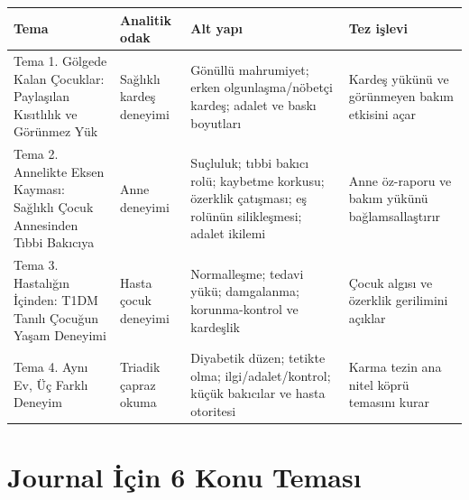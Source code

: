 \documentclass[
  turkish,
  a4paper,
  DIV=11,
  numbers=noendperiod]{scrreprt}
\newcounter{none} %
\begin{document}
{\def\LTcaptype{none} %
\begin{longtable}[]{@{}
  >{\raggedright\arraybackslash}p{}
  >{\raggedright\arraybackslash}p{}
  >{\raggedright\arraybackslash}p{}
  >{\raggedright\arraybackslash}p{}@{}}
\toprule\noalign{}
\begin{minipage}[b]{\linewidth}\raggedright
Tema
\end{minipage} & \begin{minipage}[b]{\linewidth}\raggedright
Analitik odak
\end{minipage} & \begin{minipage}[b]{\linewidth}\raggedright
Alt yapı
\end{minipage} & \begin{minipage}[b]{\linewidth}\raggedright
Tez işlevi
\end{minipage} \\
\midrule\noalign{}
\endhead
\bottomrule\noalign{}
\endlastfoot
Tema 1. Gölgede Kalan Çocuklar: Paylaşılan Kısıtlılık ve Görünmez Yük &
Sağlıklı kardeş deneyimi & Gönüllü mahrumiyet; erken olgunlaşma/nöbetçi
kardeş; adalet ve baskı boyutları & Kardeş yükünü ve görünmeyen bakım
etkisini açar \\
Tema 2. Annelikte Eksen Kayması: Sağlıklı Çocuk Annesinden Tıbbi
Bakıcıya & Anne deneyimi & Suçluluk; tıbbi bakıcı rolü; kaybetme
korkusu; özerklik çatışması; eş rolünün silikleşmesi; adalet ikilemi &
Anne öz-raporu ve bakım yükünü bağlamsallaştırır \\
Tema 3. Hastalığın İçinden: T1DM Tanılı Çocuğun Yaşam Deneyimi & Hasta
çocuk deneyimi & Normalleşme; tedavi yükü; damgalanma; korunma-kontrol
ve kardeşlik & Çocuk algısı ve özerklik gerilimini açıklar \\
Tema 4. Aynı Ev, Üç Farklı Deneyim & Triadik çapraz okuma & Diyabetik
düzen; tetikte olma; ilgi/adalet/kontrol; küçük bakıcılar ve hasta
otoritesi & Karma tezin ana nitel köprü temasını kurar \\
\end{longtable}
}

\section{Journal İçin 6 Konu
Teması}\label{journal-iuxe7in-6-konu-temasux131}
\end{document}
